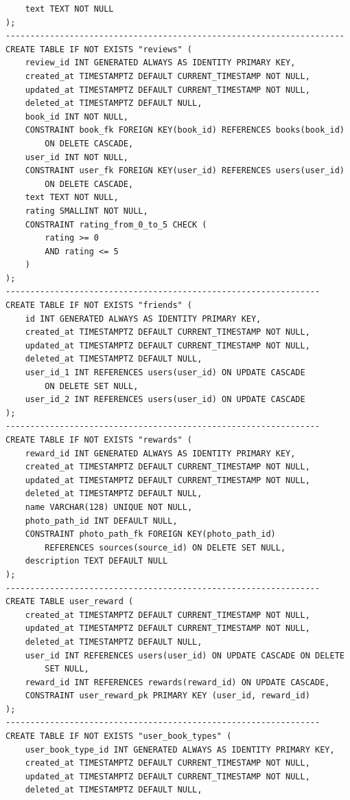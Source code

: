 \documentclass[a4paper,12pt]{article}
\begin{document}
\begin{lstlisting}
    text TEXT NOT NULL
);
---------------------------------------------------------------------
CREATE TABLE IF NOT EXISTS "reviews" (
    review_id INT GENERATED ALWAYS AS IDENTITY PRIMARY KEY,
    created_at TIMESTAMPTZ DEFAULT CURRENT_TIMESTAMP NOT NULL,
    updated_at TIMESTAMPTZ DEFAULT CURRENT_TIMESTAMP NOT NULL,
    deleted_at TIMESTAMPTZ DEFAULT NULL,
    book_id INT NOT NULL,
    CONSTRAINT book_fk FOREIGN KEY(book_id) REFERENCES books(book_id) 
        ON DELETE CASCADE,
    user_id INT NOT NULL,
    CONSTRAINT user_fk FOREIGN KEY(user_id) REFERENCES users(user_id) 
        ON DELETE CASCADE,
    text TEXT NOT NULL,
    rating SMALLINT NOT NULL,
    CONSTRAINT rating_from_0_to_5 CHECK (
        rating >= 0
        AND rating <= 5
    )
);
----------------------------------------------------------------
CREATE TABLE IF NOT EXISTS "friends" (
    id INT GENERATED ALWAYS AS IDENTITY PRIMARY KEY,
    created_at TIMESTAMPTZ DEFAULT CURRENT_TIMESTAMP NOT NULL,
    updated_at TIMESTAMPTZ DEFAULT CURRENT_TIMESTAMP NOT NULL,
    deleted_at TIMESTAMPTZ DEFAULT NULL,
    user_id_1 INT REFERENCES users(user_id) ON UPDATE CASCADE 
        ON DELETE SET NULL,
    user_id_2 INT REFERENCES users(user_id) ON UPDATE CASCADE
);
----------------------------------------------------------------
CREATE TABLE IF NOT EXISTS "rewards" (
    reward_id INT GENERATED ALWAYS AS IDENTITY PRIMARY KEY,
    created_at TIMESTAMPTZ DEFAULT CURRENT_TIMESTAMP NOT NULL,
    updated_at TIMESTAMPTZ DEFAULT CURRENT_TIMESTAMP NOT NULL,
    deleted_at TIMESTAMPTZ DEFAULT NULL,
    name VARCHAR(128) UNIQUE NOT NULL,
    photo_path_id INT DEFAULT NULL,
    CONSTRAINT photo_path_fk FOREIGN KEY(photo_path_id) 
        REFERENCES sources(source_id) ON DELETE SET NULL,
    description TEXT DEFAULT NULL
);
----------------------------------------------------------------
CREATE TABLE user_reward (
    created_at TIMESTAMPTZ DEFAULT CURRENT_TIMESTAMP NOT NULL,
    updated_at TIMESTAMPTZ DEFAULT CURRENT_TIMESTAMP NOT NULL,
    deleted_at TIMESTAMPTZ DEFAULT NULL,
    user_id INT REFERENCES users(user_id) ON UPDATE CASCADE ON DELETE 
        SET NULL,
    reward_id INT REFERENCES rewards(reward_id) ON UPDATE CASCADE,
    CONSTRAINT user_reward_pk PRIMARY KEY (user_id, reward_id)
);
----------------------------------------------------------------
CREATE TABLE IF NOT EXISTS "user_book_types" (
    user_book_type_id INT GENERATED ALWAYS AS IDENTITY PRIMARY KEY,
    created_at TIMESTAMPTZ DEFAULT CURRENT_TIMESTAMP NOT NULL,
    updated_at TIMESTAMPTZ DEFAULT CURRENT_TIMESTAMP NOT NULL,
    deleted_at TIMESTAMPTZ DEFAULT NULL,

\end{lstlisting}
\end{document}
